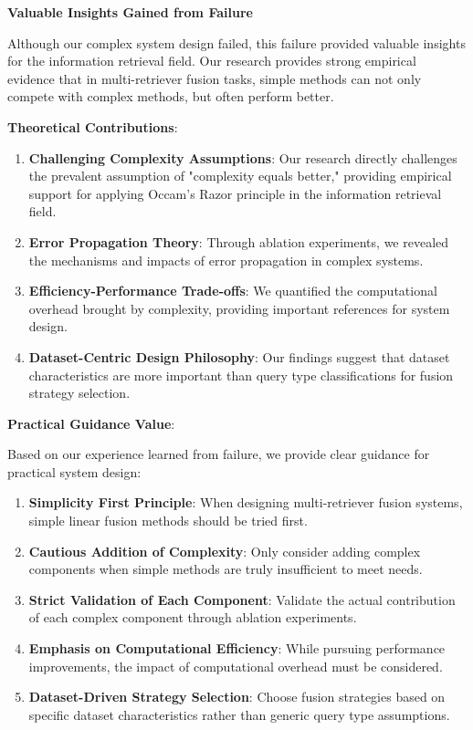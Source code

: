 \documentclass[letterpaper]{article} %
\begin{document}
\textbf{Valuable Insights Gained from Failure}

Although our complex system design failed, this failure provided valuable insights for the information retrieval field. Our research provides strong empirical evidence that in multi-retriever fusion tasks, simple methods can not only compete with complex methods, but often perform better.

\textbf{Theoretical Contributions}:
\begin{enumerate}
\item \textbf{Challenging Complexity Assumptions}: Our research directly challenges the prevalent assumption of "complexity equals better," providing empirical support for applying Occam's Razor principle in the information retrieval field.

\item \textbf{Error Propagation Theory}: Through ablation experiments, we revealed the mechanisms and impacts of error propagation in complex systems.

\item \textbf{Efficiency-Performance Trade-offs}: We quantified the computational overhead brought by complexity, providing important references for system design.

\item \textbf{Dataset-Centric Design Philosophy}: Our findings suggest that dataset characteristics are more important than query type classifications for fusion strategy selection.
\end{enumerate}

\textbf{Practical Guidance Value}:

Based on our experience learned from failure, we provide clear guidance for practical system design:
\begin{enumerate}
\item \textbf{Simplicity First Principle}: When designing multi-retriever fusion systems, simple linear fusion methods should be tried first.

\item \textbf{Cautious Addition of Complexity}: Only consider adding complex components when simple methods are truly insufficient to meet needs.

\item \textbf{Strict Validation of Each Component}: Validate the actual contribution of each complex component through ablation experiments.

\item \textbf{Emphasis on Computational Efficiency}: While pursuing performance improvements, the impact of computational overhead must be considered.

\item \textbf{Dataset-Driven Strategy Selection}: Choose fusion strategies based on specific dataset characteristics rather than generic query type assumptions.
\end{enumerate}
\end{document}
